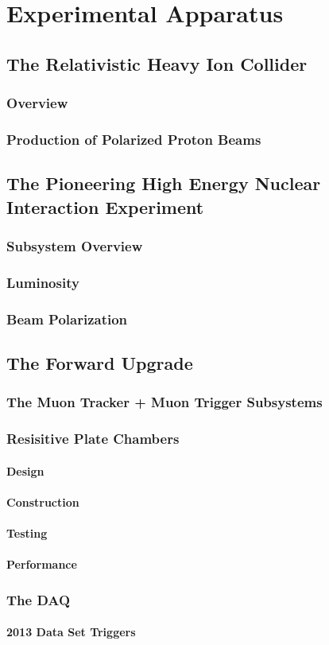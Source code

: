 \chapter{Experimental Apparatus}
\section{The Relativistic Heavy Ion Collider}
\subsection{Overview}
\subsection{Production of Polarized Proton Beams}
\section{The Pioneering High Energy Nuclear Interaction Experiment}
\subsection{Subsystem Overview}
\subsection{Luminosity}
\subsection{Beam Polarization}
\section{The Forward Upgrade}
\subsection{The Muon Tracker + Muon Trigger Subsystems}
\subsection{Resisitive Plate Chambers}
\subsubsection{Design}
\subsubsection{Construction}
\subsubsection{Testing}
\subsubsection{Performance}
\subsection{The DAQ}
\subsubsection{2013 Data Set Triggers}
